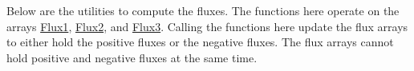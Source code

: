 Below are the utilities to compute the fluxes. The functions here operate on the arrays \url{Flux1}, \url{Flux2}, and \url{Flux3}. Calling the functions here update the flux arrays to either hold the positive fluxes or the negative fluxes. The flux arrays cannot hold positive and negative fluxes at the same time.

